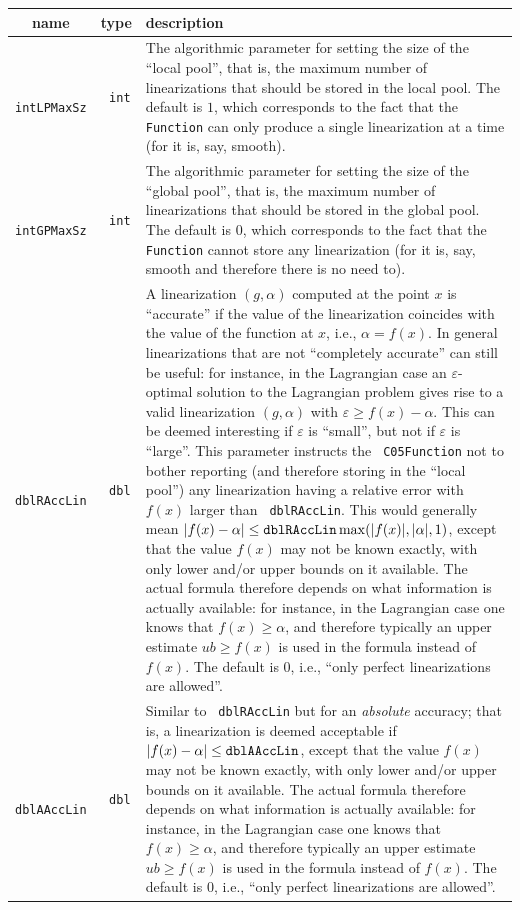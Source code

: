 \documentclass[a4paper]{article}
\newcommand{\code}[1]{\textrm{\texttt{\hyphenchar\font=200 #1}}}
\begin{document}
\begin{longtable}{|c|c|p{13.5cm}|}
 \hline
 name & type & description \\
 \hline
 \code{intLPMaxSz} & \code{int} & The algorithmic parameter for setting the size of the ``local pool'', that is, the maximum number of linearizations that should be stored in the local pool. The default is $1$, which corresponds to the fact that the \code{Function} can only produce a single linearization at a time (for it is, say, smooth).\\
 \hline
 \code{intGPMaxSz} & \code{int} & The algorithmic parameter for setting the size of the ``global pool'', that is, the maximum number of linearizations that should be stored in the global pool. The default is $0$, which corresponds to the fact that the \code{Function} cannot store any linearization (for it is, say, smooth and therefore there is no need to).\\
 \hline
 \code{dblRAccLin} & \code{dbl} & A linearization $( g , \alpha )$ computed at the point $x$ is ``accurate'' if the value of the linearization coincides with the value of the function at $x$, i.e., $\alpha = f(x)$. In general linearizations that are not ``completely accurate'' can still be useful: for instance, in the Lagrangian case an $\varepsilon$-optimal solution to the Lagrangian problem gives rise to a valid linearization $( g , \alpha )$ with $\varepsilon \geq f(x) - \alpha$. This can be deemed interesting if $\varepsilon$ is ``small'', but not if $\varepsilon$ is ``large''. This parameter instructs the \code{C05Function} not to bother reporting (and therefore storing in the ``local pool'') any linearization having a relative error with $f(x)$ larger than \code{dblRAccLin}. This would generally mean $| f(x) - \alpha | \leq \code{dblRAccLin}  \max( | f(x) | , | \alpha | , 1 )$, except that the value $f(x)$ may not be known exactly, with only lower and/or upper bounds on it available. The actual formula therefore depends on what information is actually available: for instance, in the Lagrangian case one knows that $f(x) \geq \alpha$, and therefore typically an upper estimate $ub \geq f(x)$ is used in the formula instead of $f(x)$. The default is $0$, i.e., ``only perfect linearizations are allowed''.\\
 \hline
 \code{dblAAccLin} & \code{dbl} &  Similar to \code{dblRAccLin} but for an \emph{absolute} accuracy; that is, a linearization is deemed acceptable if $| f(x) - \alpha | \leq \code{dblAAccLin}$, except that the value $f(x)$ may not be known exactly, with only lower and/or upper bounds on it available. The actual formula therefore depends on what information is actually available: for instance, in the Lagrangian case one knows that $f(x) \geq \alpha$, and therefore typically an upper estimate $ub \geq f(x)$ is used in the formula instead of $f(x)$. The default is $0$, i.e., ``only perfect linearizations are allowed''. \\

\end{longtable}
\end{document}
